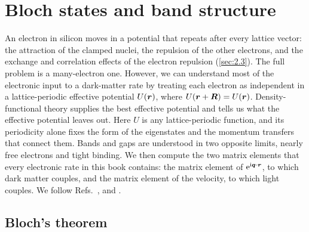 \section{Bloch states and band structure}\label{sec:3.2}

An electron in silicon moves in a potential that repeats after every lattice vector: the attraction of the clamped nuclei, the repulsion of the other electrons, and the exchange and correlation effects of the electron repulsion (\cref{sec:2.3}). The full problem is a many-electron one. However, we can understand most of the electronic input to a dark-matter rate by treating each electron as independent in a lattice-periodic effective potential $U(\bm{r})$, where $U(\bm{r} + \bm{R}) = U(\bm{r})$. Density-functional theory supplies the best effective potential and tells us what the effective potential leaves out. Here $U$ is any lattice-periodic function, and its periodicity alone fixes the form of the eigenstates and the momentum transfers that connect them. Bands and gaps are understood in two opposite limits, nearly free electrons and tight binding. We then compute the two matrix elements that every electronic rate in this book contains: the matrix element of $\mathrm{e}^{\mathrm{i}\bm{q}\cdot\bm{r}}$, to which dark matter couples, and the matrix element of the velocity, to which light couples. We follow Refs.~\cite[Chaps.~8--10]{ashcroft1976solid}, \cite[Chap.~3]{harrison1980electronic} and \cite[Chap.~2]{yu2010fundamentals}.

\subsection{Bloch's theorem}

